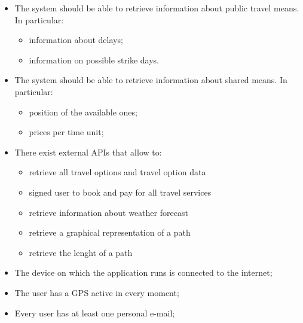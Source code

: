 \begin{itemize}

\item The system should be able to retrieve information about public travel means. In particular:
\begin{itemize}
\item information about delays;
\item information on possible strike days.
\end{itemize}

\item The system should be able to retrieve information about shared means. In particular:
\begin{itemize}
\item position of the available ones;
\item prices per time unit;
\end{itemize}

\item There exist external APIs that allow to:
\begin{itemize}
\item retrieve all travel options and travel option data
\item signed user to book and pay for all travel services
\item retrieve information about weather forecast
\item retrieve a graphical representation of a path
\item retrieve the lenght of a path
\end{itemize}

\item The device on which the application runs is connected to the internet;

\item The user has a GPS active in every moment;

\item Every user has at least one personal e-mail;

\end{itemize}




